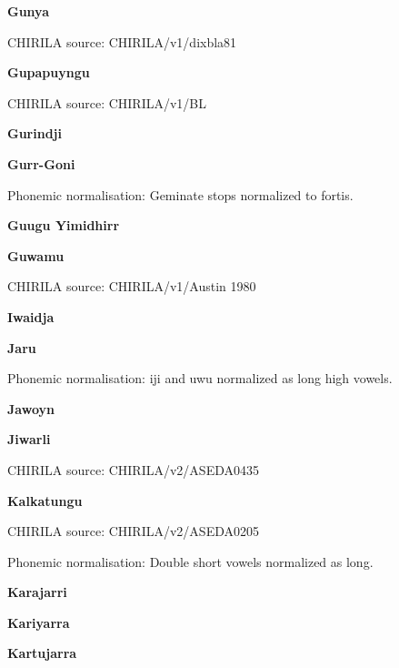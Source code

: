 
\textbf{Gunya}

CHIRILA source: CHIRILA/v1/dixbla81


\textbf{Gupapuyngu}

CHIRILA source: CHIRILA/v1/BL


\textbf{Gurindji}


\textbf{Gurr-Goni}


Phonemic normalisation: Geminate stops normalized to fortis.

\textbf{Guugu Yimidhirr}


\textbf{Guwamu}

CHIRILA source: CHIRILA/v1/Austin 1980


\textbf{Iwaidja}


\textbf{Jaru}


Phonemic normalisation: iji and uwu normalized as long high vowels.

\textbf{Jawoyn}


\textbf{Jiwarli}

CHIRILA source: CHIRILA/v2/ASEDA0435


\textbf{Kalkatungu}

CHIRILA source: CHIRILA/v2/ASEDA0205


Phonemic normalisation: Double short vowels normalized as long.

\textbf{Karajarri}


\textbf{Kariyarra}


\textbf{Kartujarra}

